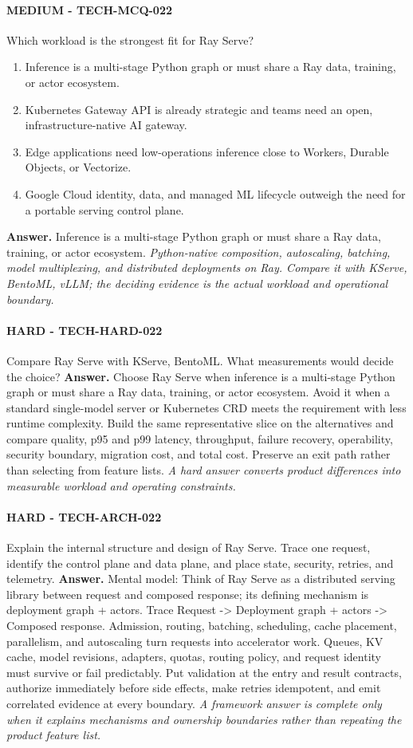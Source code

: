 \paragraph{MEDIUM - TECH-MCQ-022} Which workload is the strongest fit for Ray Serve?
\begin{enumerate}[label=\Alph*.]
\item Inference is a multi-stage Python graph or must share a Ray data, training, or actor ecosystem.
\item Kubernetes Gateway API is already strategic and teams need an open, infrastructure-native AI gateway.
\item Edge applications need low-operations inference close to Workers, Durable Objects, or Vectorize.
\item Google Cloud identity, data, and managed ML lifecycle outweigh the need for a portable serving control plane.
\end{enumerate}
\textbf{Answer.} Inference is a multi-stage Python graph or must share a Ray data, training, or actor ecosystem.
\textit{Python-native composition, autoscaling, batching, model multiplexing, and distributed deployments on Ray. Compare it with KServe, BentoML, vLLM; the deciding evidence is the actual workload and operational boundary.}
\paragraph{HARD - TECH-HARD-022} Compare Ray Serve with KServe, BentoML. What measurements would decide the choice?
\textbf{Answer.} Choose Ray Serve when inference is a multi-stage Python graph or must share a Ray data, training, or actor ecosystem. Avoid it when a standard single-model server or Kubernetes CRD meets the requirement with less runtime complexity. Build the same representative slice on the alternatives and compare quality, p95 and p99 latency, throughput, failure recovery, operability, security boundary, migration cost, and total cost. Preserve an exit path rather than selecting from feature lists.
\textit{A hard answer converts product differences into measurable workload and operating constraints.}
\paragraph{HARD - TECH-ARCH-022} Explain the internal structure and design of Ray Serve. Trace one request, identify the control plane and data plane, and place state, security, retries, and telemetry.
\textbf{Answer.} Mental model: Think of Ray Serve as a distributed serving library between request and composed response; its defining mechanism is deployment graph + actors. Trace Request -> Deployment graph + actors -> Composed response. Admission, routing, batching, scheduling, cache placement, parallelism, and autoscaling turn requests into accelerator work. Queues, KV cache, model revisions, adapters, quotas, routing policy, and request identity must survive or fail predictably. Put validation at the entry and result contracts, authorize immediately before side effects, make retries idempotent, and emit correlated evidence at every boundary.
\textit{A framework answer is complete only when it explains mechanisms and ownership boundaries rather than repeating the product feature list.}
